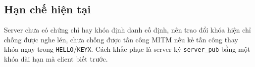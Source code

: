 \subsection{Hạn chế hiện tại}
Server chưa có chứng chỉ hay khóa định danh cố định, nên trao đổi khóa hiện chỉ chống được nghe lén, chưa chống được
tấn công MITM nếu kẻ tấn công thay khóa ngay trong \texttt{HELLO}/\texttt{KEYX}. Cách khắc phục là
server ký \texttt{server\_pub} bằng một khóa dài hạn mà client biết trước.
